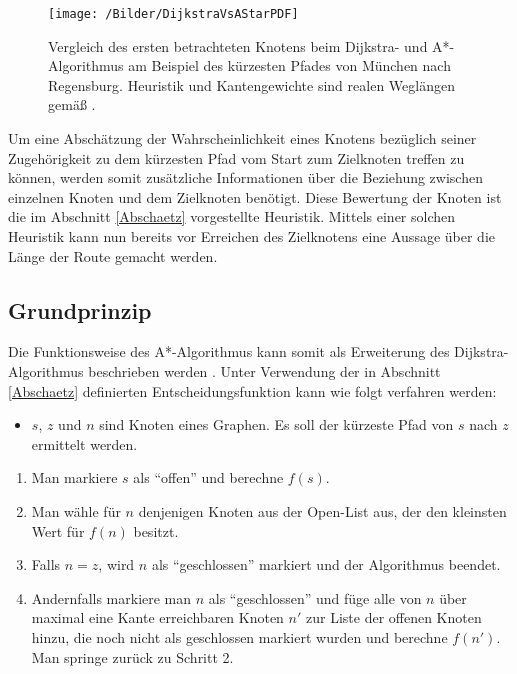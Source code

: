 	\begin{figure}[h]
	\centering
	\texttt{[image: /Bilder/DijkstraVsAStarPDF]}
	\vspace{0.2cm}
	\caption{Vergleich des ersten betrachteten Knotens beim Dijkstra- und A*-Algorithmus am Beispiel des kürzesten Pfades von München nach Regensburg. Heuristik und Kantengewichte sind realen Weglängen gemäß \cite{Luftlinie}.} \label{DijkstraVsA*}
	\end{figure}
	
	Um eine Abschätzung der Wahrscheinlichkeit eines Knotens bezüglich seiner Zugehörigkeit zu dem  kürzesten Pfad vom Start zum Zielknoten treffen zu können, werden somit zusätzliche Informationen über die Beziehung zwischen einzelnen Knoten und dem Zielknoten benötigt. Diese Bewertung der Knoten ist die im Abschnitt \ref{Abschaetz} vorgestellte Heuristik. Mittels einer solchen Heuristik kann nun bereits vor Erreichen des Zielknotens eine Aussage über die Länge der Route gemacht werden. 
	
	\subsection{Grundprinzip}
		\label{A*-Alg}
		Die Funktionsweise des A*-Algorithmus kann somit als Erweiterung des Dijkstra-Algorithmus beschrieben werden \cite{Hart1968}. Unter Verwendung der in Abschnitt \ref{Abschaetz} definierten Entscheidungsfunktion kann wie folgt verfahren werden:
		
		\begin{itemize}
			 \item 	$s$, $z$ und $n$ sind Knoten eines Graphen. Es soll der kürzeste Pfad von $s$ nach $z$ ermittelt werden. 
			
		\end{itemize}
		
		\begin{center}
			
			\begin{minipage}{0.8\linewidth}
				
				
				\begin{enumerate}
					\item Man markiere $s$ als "`offen"' und berechne $f(s)$.
					\item Man wähle für $n$ denjenigen Knoten aus der Open-List aus, der den  kleinsten Wert für $f(n)$ besitzt.
					\item Falls $n=z$, wird $n$ als "`geschlossen"' markiert und der Algorithmus beendet.
					\item Andernfalls markiere man $n$ als "`geschlossen"' und füge alle von $n$ über maximal eine Kante erreichbaren Knoten $n'$ zur Liste der offenen Knoten hinzu, die noch nicht als geschlossen markiert wurden und berechne $f(n')$. 	Man springe zurück zu Schritt 2.
				\end{enumerate}
			\end{minipage}
		\end{center}
		
